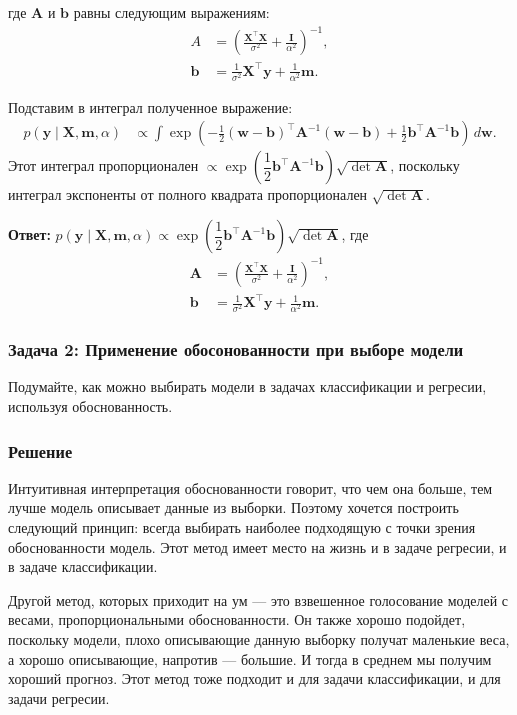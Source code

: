 где $\mathbf{A}$ и $\mathbf{b}$ равны следующим выражениям:
\begin{align*}
 A &= \left(\frac{\mathbf{X}^\top \mathbf{X}}{\sigma^2} + \frac{\mathbf{I}}{\alpha^2}\right)^{-1},\\
 \mathbf{b} &= \frac{1}{\sigma^2} \mathbf{X}^\top \mathbf{y} + \frac{1}{\alpha^2} \mathbf{m}.
\end{align*}

Подставим в интеграл полученное выражение:
\begin{align*}
 p(\mathbf{y} \mid \mathbf{X}, \mathbf{m}, \alpha) &\propto \int \exp\left(-\frac{1}{2}(\mathbf{w} - \mathbf{b})^\top \mathbf{A}^{-1} (\mathbf{w} - \mathbf{b}) + \frac{1}{2} \mathbf{b}^\top \mathbf{A}^{-1} \mathbf{b} \right) \, d\mathbf{w}.
\end{align*}
Этот интеграл пропорционален $\propto\exp\left(\dfrac{1}{2} \mathbf{b}^\top \mathbf{A}^{-1} \mathbf{b}\right) \sqrt{\det \mathbf{A}}$, поскольку интеграл экспоненты от полного квадрата пропорционален $\sqrt{\det \mathbf{A}}$.

\textbf{Ответ:} $p(\mathbf{y} \mid \mathbf{X}, \mathbf{m}, \alpha) \propto\exp\left(\dfrac{1}{2} \mathbf{b}^\top \mathbf{A}^{-1} \mathbf{b}\right) \sqrt{\det \mathbf{A}}$, где
\begin{align*}
 \mathbf{A} &= \left(\frac{\mathbf{X}^\top \mathbf{X}}{\sigma^2} + \frac{\mathbf{I}}{\alpha^2}\right)^{-1},\\
 \mathbf{b} &= \frac{1}{\sigma^2} \mathbf{X}^\top \mathbf{y} + \frac{1}{\alpha^2} \mathbf{m}.
\end{align*}

\subsubsection{Задача 2: Применение обосонованности при выборе модели}
Подумайте, как можно выбирать модели в задачах классификации и регресии, используя обоснованность.
\subsubsection{Решение}

Интуитивная интерпретация обоснованности говорит, что чем она больше, тем лучше модель описывает данные из выборки. Поэтому хочется построить следующий принцип: всегда выбирать наиболее подходящую с точки зрения обоснованности модель. Этот метод имеет место на жизнь и в задаче регресии, и в задаче классификации.

Другой метод, которых приходит на ум --- это взвешенное голосование моделей с весами, пропорциональными обоснованности. Он также хорошо подойдет, поскольку модели, плохо описывающие данную выборку получат маленькие веса, а хорошо описывающие, напротив --- большие. И тогда в среднем мы получим хороший прогноз. Этот метод тоже подходит и для задачи классификации, и для задачи регресии.

